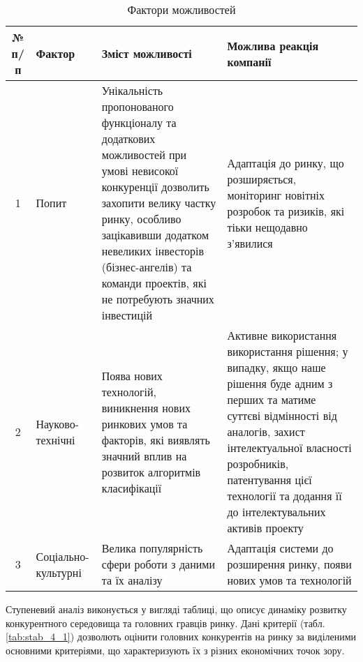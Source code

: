 \begin{table}[H]
\fontsize{12pt}{12pt}\selectfont
	\begin{tabularx}{\textwidth}{|c|X|X|X|}
    \hline
    № п/п & Фактор & Зміст можливості & Можлива реакція компанії \\ \hline
    1 & Попит & Унікальність пропонованого функціоналу та додаткових можливостей при умові невисокої конкуренції дозволить захопити велику частку ринку, особливо зацікавивши додатком невеликих інвесторів (бізнес-ангелів) та команди проектів, які не потребують значних інвестицій & Адаптація до ринку, що розширяється, моніторинг новітніх розробок та ризиків, які тіьки нещодавно з'явилися \\ \hline
    2 & Науково-технічні & Поява нових технологій, виникнення нових ринкових умов та факторів, які виявлять значний вплив на розвиток алгоритмів класифікації  & Активне використання використання рішення; у випадку, якщо наше рішення буде адним з перших та матиме суттєві відмінності від аналогів, захист інтелектуальної власності розробників, патентування цієї технології та додання її до інтелектувальних активів проекту \\ \hline
    3 & Соціально-культурні & Велика популярність сфери роботи з даними та їх аналізу & Адаптація системи до розширення ринку, появи нових умов та технологій \\
    \hline
    \end{tabularx}
\caption{Фактори можливостей} \label{tab:stab_3}
\end{table}

Ступеневий аналіз виконується у вигляді таблиці, що описує динаміку розвитку конкурентного середовища та головних гравців ринку. Дані критерії (табл. \ref{tab:stab_4_1}) дозволють оцінити головних конкурентів на ринку за виділеними основними критеріями, що характеризують їх з різних економічних точок зору.

